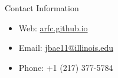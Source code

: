 \documentclass[final]{beamer}
\newlength{\onecolwid}
\begin{document}
\begin{frame}[t]
\begin{columns}[t]
\begin{column}{\onecolwid}






\begin{alertblock}{Contact Information}

\begin{itemize}
\item Web: \href{arfc.github.io}{arfc.github.io}
\item Email: \href{mailto:jbae11@illinois.edu}{jbae11@illinois.edu}
\item Phone: +1 (217) 377-5784
\end{itemize}

\end{alertblock}



\end{column} %

\end{columns} %

\end{frame} %
\end{document}
